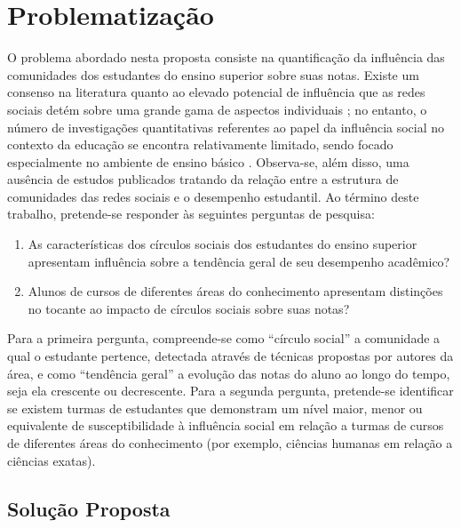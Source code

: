 \section{Problematização} \label{sec:problematisation}

O problema abordado nesta proposta consiste na quantificação da influência das comunidades dos estudantes do ensino superior sobre suas notas. Existe um consenso na literatura quanto ao elevado potencial de influência que as redes sociais detém sobre uma grande gama de aspectos individuais \cite{Christakis2007,Christakis2009,Centola2010,Iyengar2011}; no entanto, o número de investigações quantitativas referentes ao papel da influência social no contexto da educação se encontra relativamente limitado, sendo focado especialmente no ambiente de ensino básico \cite{Blansky2013,Butler-Barnes2015,Gremmen2017}. Observa-se, além disso, uma ausência de estudos publicados tratando da relação entre a estrutura de comunidades das redes sociais e o desempenho estudantil.
Ao término deste trabalho, pretende-se responder às seguintes perguntas de pesquisa:
\begin{enumerate}
    \item As características dos círculos sociais dos estudantes do ensino superior apresentam influência sobre a tendência geral de seu desempenho acadêmico?
    \item Alunos de cursos de diferentes áreas do conhecimento apresentam distinções no tocante ao impacto de círculos sociais sobre suas notas?
\end{enumerate}
Para a primeira pergunta, compreende-se como “círculo social” a comunidade a qual o estudante pertence, detectada através de técnicas propostas por autores da área, e como “tendência geral” a evolução das notas do aluno ao longo do tempo, seja ela crescente ou decrescente. Para a segunda pergunta, pretende-se identificar se existem turmas de estudantes que demonstram um nível maior, menor ou equivalente de susceptibilidade à influência social em relação a turmas de cursos de diferentes áreas do conhecimento (por exemplo, ciências humanas em relação a ciências exatas).

\subsection{Solução Proposta} \label{sec:proposal}

